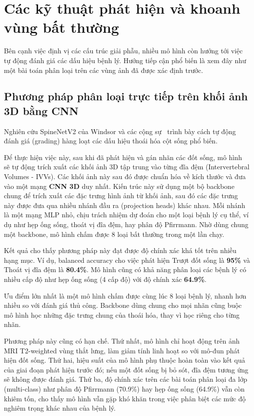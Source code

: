\section{Các kỹ thuật phát hiện và khoanh vùng bất thường}
\label{sec:rw_grading}

Bên cạnh việc định vị các cấu trúc giải phẫu, nhiều mô hình còn hướng tới việc tự động đánh giá các dấu hiệu bệnh lý. Hướng tiếp cận phổ biến là xem đây như một bài toán phân loại trên các vùng ảnh đã được xác định trước.

\subsection{Phương pháp phân loại trực tiếp trên khối ảnh 3D bằng CNN}

Nghiên cứu SpineNetV2 của Windsor và các cộng sự~\cite{windsor2022spinenetv2} trình bày cách tự động đánh giá (grading) hàng loạt các dấu hiệu thoái hóa cột sống phổ biến.

Để thực hiện việc này, sau khi đã phát hiện và gán nhãn các đốt sống, mô hình sẽ tự động trích xuất các khối ảnh 3D tập trung vào từng đĩa đệm (Intervertebral Volumes - IVVs). Các khối ảnh này sau đó được chuẩn hóa về kích thước và đưa vào một mạng \textbf{CNN 3D} duy nhất. Kiến trúc này sử dụng một bộ backbone chung để trích xuất các đặc trưng hình ảnh từ khối ảnh, sau đó các đặc trưng này được đưa qua nhiều nhánh đầu ra (projection heads) khác nhau. Mỗi nhánh là một mạng MLP nhỏ, chịu trách nhiệm dự đoán cho một loại bệnh lý cụ thể, ví dụ như hẹp ống sống, thoát vị đĩa đệm, hay phân độ Pfirrmann. Nhờ dùng chung một backbone, mô hình chấm được 8 loại bất thường trong một lần chạy.

Kết quả cho thấy phương pháp này đạt được độ chính xác khá tốt trên nhiều hạng mục. Ví dụ, balanced accuracy cho việc phát hiện Trượt đốt sống là \textbf{95\%} và Thoát vị đĩa đệm là \textbf{80.4\%}. Mô hình cũng có khả năng phân loại các bệnh lý có nhiều cấp độ như hẹp ống sống (4 cấp độ) với độ chính xác \textbf{64.9\%}.

Ưu điểm lớn nhất là một mô hình chấm được cùng lúc 8 loại bệnh lý, nhanh hơn nhiều so với đánh giá thủ công. Backbone dùng chung cho mọi nhãn cũng buộc mô hình học những đặc trưng chung của thoái hóa, thay vì học riêng cho từng nhãn.

Phương pháp này cũng có hạn chế. Thứ nhất, mô hình chỉ hoạt động trên ảnh MRI T2-weighted vùng thắt lưng, làm giảm tính linh hoạt so với mô-đun phát hiện đốt sống. Thứ hai, hiệu suất của mô hình phụ thuộc hoàn toàn vào kết quả của giai đoạn phát hiện trước đó; nếu một đốt sống bị bỏ sót, đĩa đệm tương ứng sẽ không được đánh giá. Thứ ba, độ chính xác trên các bài toán phân loại đa lớp (multi-class) như phân độ Pfirrmann (70.9\%) hay hẹp ống sống (64.9\%) vẫn còn khiêm tốn, cho thấy mô hình vẫn gặp khó khăn trong việc phân biệt các mức độ nghiêm trọng khác nhau của bệnh lý.

